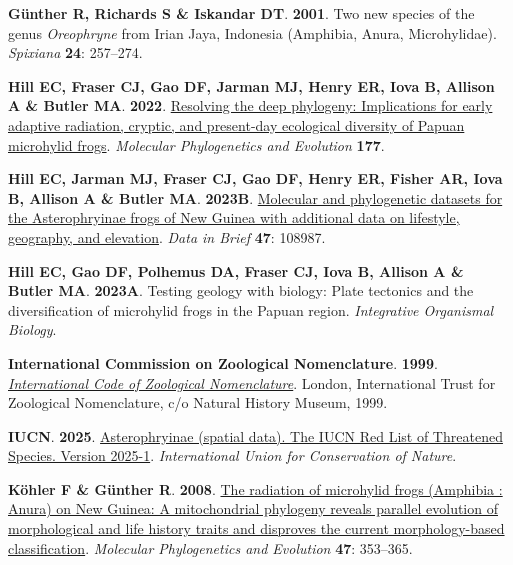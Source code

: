 \documentclass[
  letterpaper,
  DIV=11,
  numbers=noendperiod]{scrartcl}
\newlength{\cslhangindent}
\newenvironment{CSLReferences}[2] %
 {\begin{list}{}{%
  \setlength{\itemindent}{0pt}
  \setlength{\leftmargin}{0pt}
  \setlength{\parsep}{0pt}
  \ifodd #1
   \setlength{\leftmargin}{\cslhangindent}
   \setlength{\itemindent}{-1\cslhangindent}
  \fi
  \setlength{\itemsep}{#2\baselineskip}}}
 {\end{list}}
\begin{document}
\begin{CSLReferences}{0}{1}
\textbf{\textbf{Günther R}, \textbf{Richards S} \& \textbf{Iskandar
DT}}. \textbf{2001}. {Two new species of the genus \emph{Oreophryne}
from Irian Jaya, Indonesia (Amphibia, Anura, Microhylidae)}.
\emph{Spixiana} \textbf{24}: 257--274.

\textbf{\textbf{Hill EC}, \textbf{Fraser CJ}, \textbf{Gao DF},
\textbf{Jarman MJ}, \textbf{Henry ER}, \textbf{Iova B}, \textbf{Allison
A} \& \textbf{Butler MA}}. \textbf{2022}.
\href{https://doi.org/10.1016/j.ympev.2022.107618}{{Resolving the deep
phylogeny: Implications for early adaptive radiation, cryptic, and
present-day ecological diversity of Papuan microhylid frogs}}.
\emph{Molecular Phylogenetics and Evolution} \textbf{177}.

\textbf{\textbf{Hill EC}, \textbf{Jarman MJ}, \textbf{Fraser CJ},
\textbf{Gao DF}, \textbf{Henry ER}, \textbf{Fisher AR}, \textbf{Iova B},
\textbf{Allison A} \& \textbf{Butler MA}}. \textbf{2023B}.
\href{https://doi.org/10.1016/j.dib.2023.108987}{{Molecular and
phylogenetic datasets for the Asterophryinae frogs of New Guinea with
additional data on lifestyle, geography, and elevation}}. \emph{Data in
Brief} \textbf{47}: 108987.

\textbf{\textbf{Hill EC}, \textbf{Gao DF}, \textbf{Polhemus DA},
\textbf{Fraser CJ}, \textbf{Iova B}, \textbf{Allison A} \&
\textbf{Butler MA}}. \textbf{2023A}. {Testing geology with biology:
Plate tectonics and the diversification of microhylid frogs in the
Papuan region}. \emph{Integrative Organismal Biology}.

\textbf{\textbf{International Commission on Zoological Nomenclature}}.
\textbf{1999}.
\emph{\href{https://www.biodiversitylibrary.org/item/107142}{{International
Code of Zoological Nomenclature}}}. London, International Trust for
Zoological Nomenclature, c/o Natural History Museum, 1999.

\textbf{\textbf{IUCN}}. \textbf{2025}.
\href{https://www.iucnredlist.org/}{{Asterophryinae (spatial data). The
IUCN Red List of Threatened Species. Version 2025-1}}.
\emph{International Union for Conservation of Nature}.

\textbf{\textbf{Köhler F} \& \textbf{Günther R}}. \textbf{2008}.
\href{https://doi.org/DOI\%2010.1016/j.ympev.2007.11.032}{{The radiation
of microhylid frogs (Amphibia : Anura) on New Guinea: A mitochondrial
phylogeny reveals parallel evolution of morphological and life history
traits and disproves the current morphology-based classification}}.
\emph{Molecular Phylogenetics and Evolution} \textbf{47}: 353--365.


\end{CSLReferences}
\end{document}
